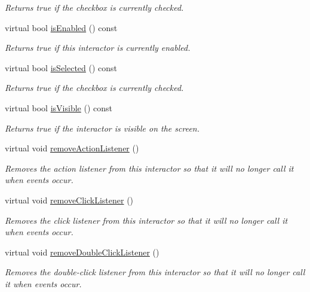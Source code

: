 \begin{DoxyCompactItemize}
\begin{DoxyCompactList}\small\item\em Returns true if the checkbox is currently checked. \end{DoxyCompactList}\item 
virtual bool \mbox{\hyperlink{classGInteractor_aacb819fb241851fd9fc045271baa4034}{is\+Enabled}} () const
\begin{DoxyCompactList}\small\item\em Returns true if this interactor is currently enabled. \end{DoxyCompactList}\item 
virtual bool \mbox{\hyperlink{classGCheckBox_a56a065a2c20a230931de0ed98019d8fb}{is\+Selected}} () const
\begin{DoxyCompactList}\small\item\em Returns true if the checkbox is currently checked. \end{DoxyCompactList}\item 
virtual bool \mbox{\hyperlink{classGInteractor_a9d8a6cfb13917785c143e74d40e4e2be}{is\+Visible}} () const
\begin{DoxyCompactList}\small\item\em Returns true if the interactor is visible on the screen. \end{DoxyCompactList}\item 
virtual void \mbox{\hyperlink{classGInteractor_ab7fe7a876367b87cf7202f947f1d05e4}{remove\+Action\+Listener}} ()
\begin{DoxyCompactList}\small\item\em Removes the action listener from this interactor so that it will no longer call it when events occur. \end{DoxyCompactList}\item 
virtual void \mbox{\hyperlink{classGInteractor_ad39d0325cde6b97ebda4b9d7787c633b}{remove\+Click\+Listener}} ()
\begin{DoxyCompactList}\small\item\em Removes the click listener from this interactor so that it will no longer call it when events occur. \end{DoxyCompactList}\item 
virtual void \mbox{\hyperlink{classGInteractor_aa4250907e4cdd77349c04f0cf5cdd3d3}{remove\+Double\+Click\+Listener}} ()
\begin{DoxyCompactList}\small\item\em Removes the double-\/click listener from this interactor so that it will no longer call it when events occur. \end{DoxyCompactList}\item 

\end{DoxyCompactItemize}

